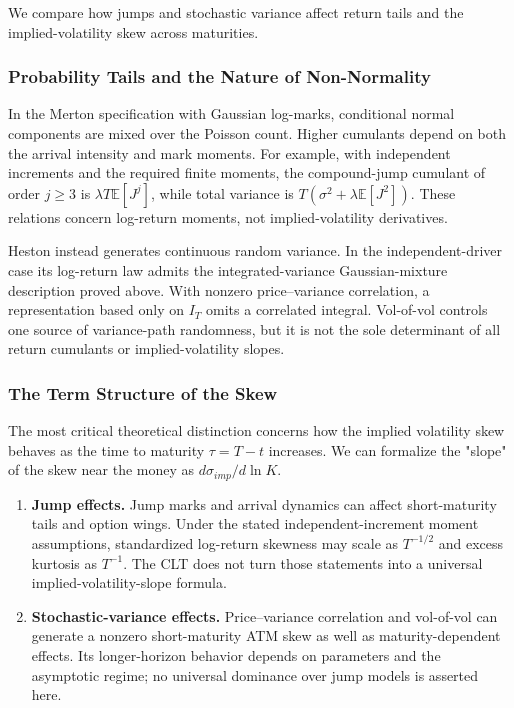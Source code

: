 We compare how jumps and stochastic variance affect return tails and the implied-volatility skew across maturities.
\subsubsection{Probability Tails and the Nature of Non-Normality}

In the Merton specification with Gaussian log-marks, conditional
normal components are mixed over the Poisson count. Higher cumulants
depend on both the arrival intensity and mark moments. For example,
with independent increments and the required finite moments, the compound-jump
cumulant of order $j\ge3$ is $\lambda T\mathbb E[J^j]$, while total
variance is $T(\sigma^2+\lambda\mathbb E[J^2])$. These relations concern
log-return moments, not implied-volatility derivatives.

Heston instead generates continuous random variance. In the
independent-driver case its log-return law admits the integrated-variance
Gaussian-mixture description proved above. With nonzero
price--variance correlation, a representation based only on $I_T$
omits a correlated integral. Vol-of-vol controls one source of
variance-path randomness, but it is not the sole determinant of all
return cumulants or implied-volatility slopes.

\subsubsection{The Term Structure of the Skew}

The most critical theoretical distinction concerns how the implied volatility skew behaves as the time to maturity $\tau = T - t$ increases. We can formalize the "slope" of the skew near the money as $d \sigma_{imp} / d \ln K$.

\begin{enumerate}
\item \textbf{Jump effects.} Jump marks and arrival dynamics can affect
short-maturity tails and option wings. Under the stated independent-increment
moment assumptions, standardized log-return skewness may scale
as $T^{-1/2}$ and excess kurtosis as $T^{-1}$. The CLT does not turn
those statements into a universal implied-volatility-slope formula.
\item \textbf{Stochastic-variance effects.} Price--variance correlation
and vol-of-vol can generate a nonzero short-maturity ATM skew as well
as maturity-dependent effects. Its longer-horizon behavior depends
on parameters and the asymptotic regime; no universal dominance over
jump models is asserted here.
\end{enumerate}
